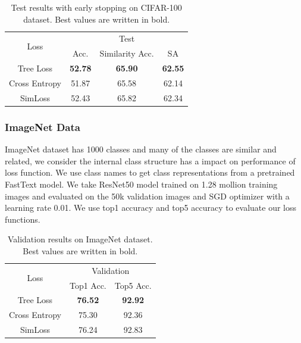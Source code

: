 \documentclass[twoside]{article}
\theoremstyle{definition}
\begin{document}
\begin{table}[]
\caption{Test results with early stopping on CIFAR-100 dataset. Best values are written in bold.} \label{cifar100}
\begin{center}
\begin{tabular}{@{}cccc@{}}
\toprule
\multirow{2}{*}{Loss} & \multicolumn{3}{c}{Test}    \\ \cmidrule(l){2-4} 
                      & Acc. & Similarity Acc. & SA \\ \cmidrule(r){1-1}
Tree Loss       & \textbf{52.78}     &  \textbf{65.90}               &  \textbf{62.55}  \\
Cross Entropy         &  51.87    &   65.58              &  62.14  \\
SimLoss               &    52.43  &    65.82             & 62.34  \\\bottomrule
\end{tabular}
\end{center}
\end{table}


\subsubsection{ImageNet Data}
ImageNet dataset \cite{Russakovsky2015ImageNetLS} has 1000 classes and many of the classes are similar and related, we consider the internal class structure has a impact on performance of loss function.
We use class names to get class representations from a pretrained FastText model.
We take ResNet50 model \cite{He2016DeepRL} trained on 1.28 mollion training images and evaluated on the 50k validation images and SGD optimizer with a learning rate 0.01.
We use top1 accuracy and top5 accuracy to evaluate our loss functions.



\begin{table}[]
\caption{Validation results on ImageNet dataset. Best values are written in bold.} \label{imagenet}
\begin{center}
\begin{tabular}{@{}ccc@{}}
\toprule
\multirow{2}{*}{Loss} & \multicolumn{2}{c}{Validation} \\ \cmidrule(l){2-3} 
                      & Top1 Acc.      & Top5 Acc.     \\ \cmidrule(r){1-1}
Tree Loss       & \textbf{76.52} & \textbf{92.92} \\
Cross Entropy         & 75.30          & 92.36         \\
SimLoss               & 76.24          & 92.83         \\ \bottomrule
\end{tabular}
\end{center}
\end{table}
\end{document}
